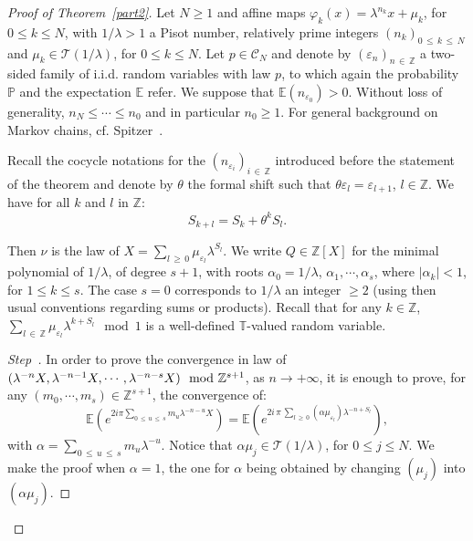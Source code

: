 \documentclass[10pt]{amsart}
\theoremstyle{definition}\newtheorem{defi}[theo]{Definition}\newtheorem{rema}[theo]{Remark}\newtheorem{exam}[theo]{Example}\newtheorem{exem}[theo]{Example}\newtheorem{nota}[theo]{Notation}
\newcommand{\Pbb}{\mathbb P}
\newcommand{\Ebb}{\mathbb E}
\newcommand{\Tbb}{\mathbb T}
\newcommand{\Zbb}{\mathbb Z}
\newcommand{\Ccl}{\mathcal{C}}
\newcommand{\Tcl}{\mathcal{T}}
\newcounter{stepcount}
\newenvironment{step}{\refstepcounter{stepcount}\begin{proof}[Step~\thestepcount]}{\let\qed\relax\end{proof}}
\begin{document}
\begin{proof}[{Proof of Theorem~\ref{part2}}]
Let $N\geq 1$ and affine maps $\varphi_k(x)=\lambda^{n_k}x+\mu_k$, for $0\leq k\leq N$, with $1/\lambda>1$ a Pisot number, relatively prime integers $(n_k)_{0\,\leq\,k\,\leq\,N}$ and $\mu_k\in {\Tcl}(1/\lambda)$, for $0\leq k\leq N$. Let $p\in{\Ccl}_N$ and denote by $(\varepsilon_n)_{n\,\in\,\Zbb}$ a two-sided family of i.i.d. random variables with law $p$, to which again the probability $\Pbb$ and the expectation $\Ebb$ refer. We suppose that $\Ebb(n_{\varepsilon_0})>0$. Without loss of generality, $n_N\leq\cdots\leq n_0$ and in particular $n_0\geq1$. For general background on Markov chains, cf. Spitzer~\cite{spitz}.


Recall the cocycle notations for the $(n_{\varepsilon_i})_{i\,\in\,\Zbb}$ introduced before the statement of the theorem and denote by $\theta$ the formal shift such that $\theta \varepsilon_l=\varepsilon_{l+1}$, $l\in\Zbb$. We have for all $k$ and $l$ in $\Zbb$:
\[
S_{k+l}=S_k+\theta^kS_l.
\]


Then $\nu$ is the law of $X=\sum_{l\,\geq\,0}\mu_{\varepsilon_l}\lambda^{S_l}$. We write $Q\in\Zbb[X]$ for the minimal polynomial of $1/\lambda$, of degree $s+1$, with roots $\alpha_0=1/\lambda$, $\alpha_1,\cdots, \alpha_s$, where $|\alpha_k|<1$, for $1\leq k\leq s$. The case $s=0$ corresponds to $1/\lambda$ an integer $\geq2$ (using then usual conventions regarding sums or products). Recall that for any $k\in\Zbb$, $\sum_{l\,\in\,\Zbb}\mu_{\varepsilon_l}\lambda^{k+S_l}\mod 1$ is a well-defined $\Tbb$-valued random variable.


\setcounter{stepcount}{0}
\begin{step}\label{sect4step1}
In order to prove the convergence in law of $(\lambda^{-n}X,\lambda^{-n-1}X,\cdots,\lambda^{-n-s}\linebreak X)\mod \Zbb^{s+1}$, as $n\rightarrow+\infty$, it is enough to prove, for any $(m_0,\cdots,m_s)\in\Zbb^{s+1}$, the convergence of:
\[
\Ebb\left({e^{2i\pi\sum_{0\,\leq\,u\,\leq\,s}m_u\lambda^{-n-u}X}}\right)=\Ebb\left({e^{2i\,\pi \,\sum_{l\,\geq\,0}(\alpha\mu_{\varepsilon_l})\lambda^{-n+S_l}}}\right),
\]
with $\alpha=\sum_{0\,\leq\,u\,\leq\,s}m_u\lambda^{-u}$. Notice that $\alpha\mu_j\in{\Tcl}(1/\lambda)$, for $0\leq j\leq N$. We make the proof when $\alpha=1$, the one for $\alpha$ being obtained by changing $(\mu_j)$ into $(\alpha\mu_j)$.


\end{step}
\end{proof}
\end{document}
